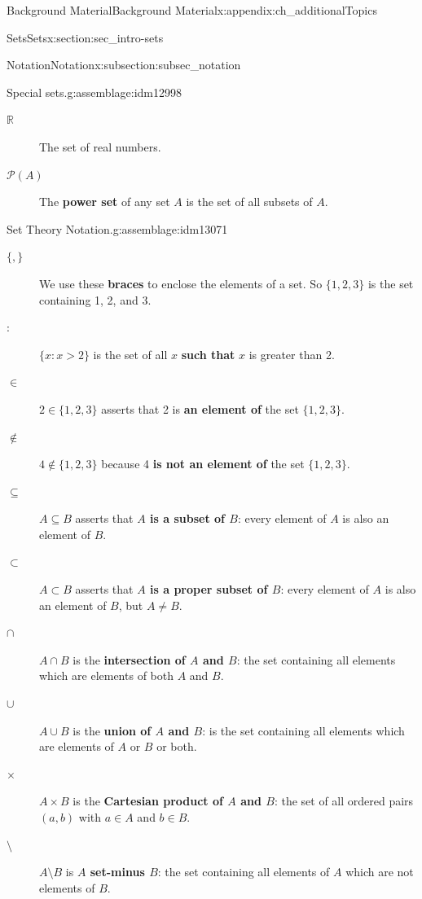 \documentclass[oneside,10pt,]{book}
\newcommand{\terminology}[1]{\textbf{#1}}
\numberwithin{equation}{chapter}
\def\R{\mathbb R}
\def\pow{\mathcal P}
\def\st{:}
\begin{document}
\begin{appendixptx}{Background Material}{}{Background Material}{}{}{x:appendix:ch_additionalTopics}
\begin{sectionptx}{Sets}{}{Sets}{}{}{x:section:sec_intro-sets}
\begin{subsectionptx}{Notation}{}{Notation}{}{}{x:subsection:subsec_notation}
\begin{assemblage}{Special sets.}{g:assemblage:idm12998}
\begin{description}
\item[{\(\R\)}]The set of real numbers.      \label{g:notation:idm13055}%
\item[{\(\pow(A)\)}]The \terminology{power set} of any set \(A\) is the set of all subsets of \(A\).\label{g:notation:idm13067}%
\end{description}
%
\end{assemblage}
\begin{assemblage}{Set Theory Notation.}{g:assemblage:idm13071}%
%
\begin{description}
\item[{\(\{, \}\)}]We use these \terminology{braces} to enclose the elements of a set. So \(\{1,2,3\}\) is the set containing 1, 2, and 3.\label{g:notation:idm13081}%
\item[{\(\st\)}]\(\{x \st x > 2\}\) is the set of all \(x\) \terminology{such that} \(x\) is greater than 2.\label{g:notation:idm13092}%
\item[{\(\in\)}]\(2 \in \{1,2,3\}\) asserts that 2 is \terminology{an element of} the set \(\{1,2,3\}\). \label{g:notation:idm13103}%
\item[{\(\not\in\)}]\(4 \notin \{1,2,3\}\) because 4 \terminology{is not an element of} the set \(\{1,2,3\}\).%
\item[{\(\subseteq\)}]\(A \subseteq B\) asserts that \terminology{\(A\) is a subset of \(B\)}: every element of \(A\) is also an element of \(B\).      \label{g:notation:idm13124}%
\item[{\(\subset\)}]\(A \subset B\) asserts that  \terminology{\(A\) is a proper subset of \(B\)}: every element of \(A\) is also an element of \(B\), but \(A \ne B\).\label{g:notation:idm13139}%
\item[{\(\cap\)}]\(A \cap B\) is the \terminology{intersection of \(A\) and \(B\)}: the set containing all elements which are elements of both \(A\) and \(B\). \label{g:notation:idm13153}%
\item[{\(\cup\)}]\(A \cup B\) is the \terminology{union of \(A\) and \(B\)}: is the set containing all elements which are elements of \(A\) or \(B\) or both.\label{g:notation:idm13168}%
\item[{\(\times\)}]\(A \times B\) is the \terminology{Cartesian product of \(A\) and   \(B\)}: the set of all ordered pairs \((a,b)\) with \(a \in A\) and \(b \in B\).\label{g:notation:idm13184}%
\item[{\(\setminus\)}]\(A \setminus B\) is \terminology{\(A\) set-minus \(B\)}: the set containing all elements of \(A\) which are not elements of \(B\).\label{g:notation:idm13197}%

\end{description}
\end{assemblage}
\end{subsectionptx}
\end{sectionptx}
\end{appendixptx}
\end{document}
